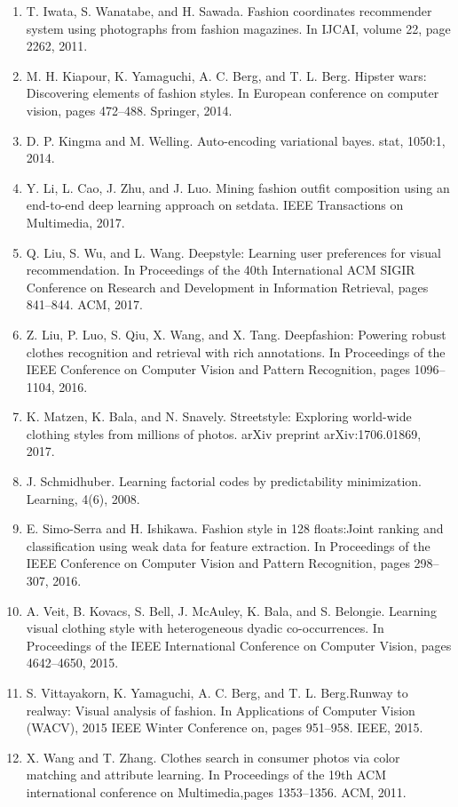 \begin{enumerate}
\item T. Iwata, S. Wanatabe, and H. Sawada. Fashion coordinates recommender system using photographs from fashion magazines. In IJCAI, volume 22, page 2262, 2011.
\item M. H. Kiapour, K. Yamaguchi, A. C. Berg, and T. L. Berg. Hipster wars: Discovering elements of fashion styles. In European conference on computer vision, pages 472–488. Springer, 2014.
\item D. P. Kingma and M. Welling. Auto-encoding variational bayes. stat, 1050:1, 2014.
\item Y. Li, L. Cao, J. Zhu, and J. Luo. Mining fashion outfit composition using an end-to-end deep learning approach on setdata. IEEE Transactions on Multimedia, 2017.
\item Q. Liu, S. Wu, and L. Wang. Deepstyle: Learning user preferences for visual recommendation. In Proceedings of the 40th International ACM SIGIR Conference on Research and Development in Information Retrieval, pages 841–844. ACM, 2017.
\item Z. Liu, P. Luo, S. Qiu, X. Wang, and X. Tang. Deepfashion: Powering robust clothes recognition and retrieval with rich annotations. In Proceedings of the IEEE Conference on Computer Vision and Pattern Recognition, pages 1096–1104, 2016.
\item K. Matzen, K. Bala, and N. Snavely. Streetstyle: Exploring world-wide clothing styles from millions of photos. arXiv preprint arXiv:1706.01869, 2017.
\item J. Schmidhuber. Learning factorial codes by predictability minimization. Learning, 4(6), 2008.
\item E. Simo-Serra and H. Ishikawa. Fashion style in 128 floats:Joint ranking and classification using weak data for feature extraction. In Proceedings of the IEEE Conference on Computer Vision and Pattern Recognition, pages 298–307, 2016.
\item A. Veit, B. Kovacs, S. Bell, J. McAuley, K. Bala, and S. Belongie. Learning visual clothing style with heterogeneous dyadic co-occurrences. In Proceedings of the IEEE International Conference on Computer Vision, pages 4642–4650, 2015.
\item S. Vittayakorn, K. Yamaguchi, A. C. Berg, and T. L. Berg.Runway to realway: Visual analysis of fashion. In Applications of Computer Vision (WACV), 2015 IEEE Winter Conference on, pages 951–958. IEEE, 2015.
\item X. Wang and T. Zhang. Clothes search in consumer photos via color matching and attribute learning. In Proceedings of the 19th ACM international conference on Multimedia,pages 1353–1356. ACM, 2011.

\end{enumerate}
